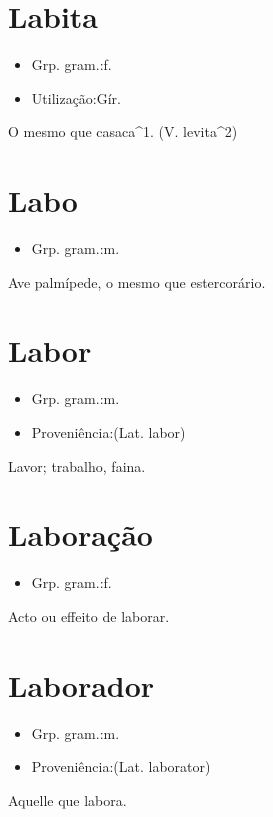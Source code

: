 \section{Labita}
\begin{itemize}
\item {Grp. gram.:f.}
\end{itemize}
\begin{itemize}
\item {Utilização:Gír.}
\end{itemize}
O mesmo que \textunderscore casaca\textunderscore ^1.
(V. \textunderscore levita\textunderscore ^2)
\section{Labo}
\begin{itemize}
\item {Grp. gram.:m.}
\end{itemize}
Ave palmípede, o mesmo que \textunderscore estercorário\textunderscore .
\section{Labor}
\begin{itemize}
\item {Grp. gram.:m.}
\end{itemize}
\begin{itemize}
\item {Proveniência:(Lat. \textunderscore labor\textunderscore )}
\end{itemize}
Lavor; trabalho, faina.
\section{Laboração}
\begin{itemize}
\item {Grp. gram.:f.}
\end{itemize}
Acto ou effeito de laborar.
\section{Laborador}
\begin{itemize}
\item {Grp. gram.:m.}
\end{itemize}
\begin{itemize}
\item {Proveniência:(Lat. \textunderscore laborator\textunderscore )}
\end{itemize}
Aquelle que labora.
